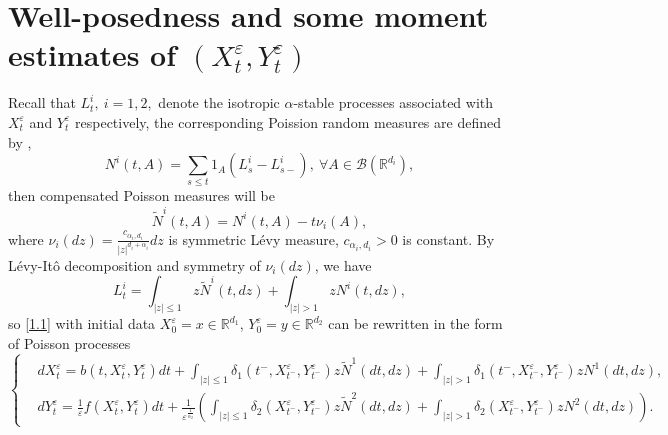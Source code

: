 \documentclass[11pt,reqno]{amsart}
\numberwithin{equation}{section}
\begin{document}
\section{Well-posedness and some moment estimates of $(X_{t}^{\varepsilon},Y_{t}^{\varepsilon})$ }\label{moment}

Recall that $ L_{t}^{i},\ i=1,2,$ denote the isotropic $\alpha$-stable processes associated with $X_{t}^{\varepsilon}$ and $Y_{t}^{\varepsilon}$ respectively, the corresponding Poission random measures are defined by \cite{DA},
$$ N^{i}(t,A)=\sum_{s\leq t}1_{A}(L_{s}^{i}-L_{s-}^{i}),\ \forall A\in \mathcal{B}(\mathbb{R}^{d_{i} }),$$
then compensated Poisson measures will be 
$$ \tilde{N}^{i}(t,A)=N^{i}(t,A)-t\nu_{i}(A),$$
where $\nu_{i}(dz)=\frac{c_{\alpha_{i},d_{i}}}{|z|^{d_{i}+\alpha_{i}}}dz$ is symmetric L\'{e}vy measure, $c_{\alpha_{i},d_{i}}>0$ is constant. By L\'{e}vy-It\^{o} decomposition and symmetry of $\nu_{i}(dz)$, we have
\begin{equation}\label{3.1}
	 L^{i}_{t}=\int_{|z|\leq1}z \tilde{N}^{i}(t,dz)+\int_{|z|>1}zN^{i}(t,dz),
\end{equation}	 
so \eqref{1.1} with initial data  $X^{\varepsilon}_{0}=x\in \mathbb{R}^{d_{1} }$, $ Y^{\varepsilon}_{0}=y\in \mathbb{R}^{d_{2} }$ can be rewritten in the form of Poisson processes
\begin{equation}\label{3.2}
	\left\{
\begin{aligned}
	&dX_{t}^{\varepsilon}=b(t,X_{t}^{\varepsilon},Y_{t}^{\varepsilon})dt+\int_{|z|\leq1}\delta_{1}(t^{-},X_{t^{-}}^{\varepsilon},Y_{t^{-}}^{\varepsilon})z \tilde{N}^{1}(dt,dz)+\int_{|z|>1}\delta_{1}(t^{-},X_{t^{-}}^{\varepsilon},Y_{t^{-}}^{\varepsilon})zN^{1}(dt,dz),\\
	&dY_{t}^{\varepsilon}=\frac{1}{\varepsilon}f(X_{t}^{\varepsilon},Y_{t}^{\varepsilon})dt+\frac{1}{\varepsilon^{\frac{1}{\alpha_{2}}}}\left( \int_{|z|\leq1}\delta_{2}(X_{t^{-}}^{\varepsilon},Y_{t^{-}}^{\varepsilon})z \tilde{N}^{2}(dt,dz)+\int_{|z|>1}\delta_{2}(X_{t^{-}}^{\varepsilon},Y_{t^{-}}^{\varepsilon})zN^{2}(dt,dz)\right).
\end{aligned}
\right.
\end{equation}
\end{document}
